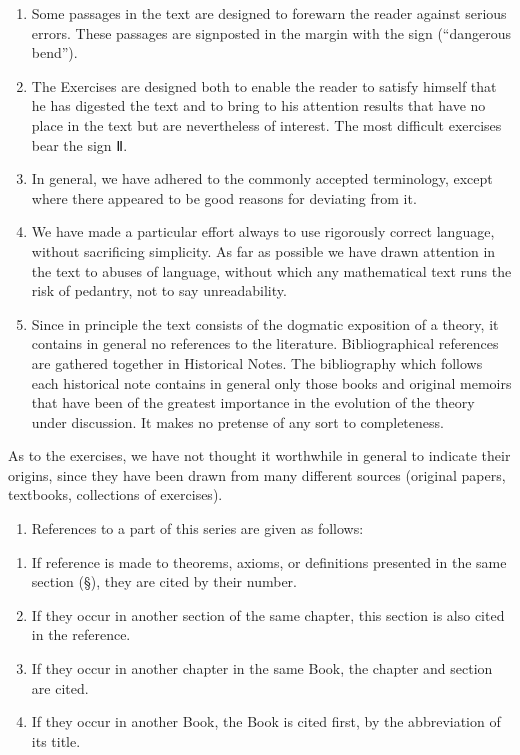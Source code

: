 \begin{enumerate}
\def\labelenumi{\arabic{enumi}.}
\setcounter{enumi}{5}
\item
  Some passages in the text are designed to forewarn the reader against serious errors. These passages are signposted in the margin with the sign (``dangerous bend'').
\item
  The Exercises are designed both to enable the reader to satisfy himself that he has digested the text and to bring to his attention results that have no place in the text but are nevertheless of interest. The most difficult exercises bear the sign Ⅱ.
\item
  In general, we have adhered to the commonly accepted terminology, except where there appeared to be good reasons for deviating from it.
\item
  We have made a particular effort always to use rigorously correct language, without sacrificing simplicity. As far as possible we have drawn attention in the text to abuses of language, without which any mathematical text runs the risk of pedantry, not to say unreadability.
\item
  Since in principle the text consists of the dogmatic exposition of a theory, it contains in general no references to the literature. Bibliographical references are gathered together in Historical Notes. The bibliography which follows each historical note contains in general only those books and original memoirs that have been of the greatest importance in the evolution of the theory under discussion. It makes no pretense of any sort to completeness.
\end{enumerate}

As to the exercises, we have not thought it worthwhile in general to indicate their origins, since they have been drawn from many different sources (original papers, textbooks, collections of exercises).

\begin{enumerate}
\def\labelenumi{\arabic{enumi}.}
\setcounter{enumi}{10}
\tightlist
\item
  References to a part of this series are given as follows:
\end{enumerate}

\begin{enumerate}
\def\labelenumi{\alph{enumi})}
\item
  If reference is made to theorems, axioms, or definitions presented in the same section (§), they are cited by their number.
\item
  If they occur in another section of the same chapter, this section is also cited in the reference.
\item
  If they occur in another chapter in the same Book, the chapter and section are cited.
\item
  If they occur in another Book, the Book is cited first, by the abbreviation of its title.
\end{enumerate}

